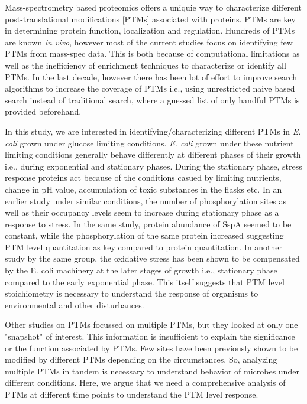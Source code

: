 \documentclass[12pt]{article}
\begin{document}
Mass-spectrometry based proteomics offers a uniquie way to characterize different post-translational modifications [PTMs] associated with proteins. PTMs are key in determining protein function, localization and regulation. Hundreds of PTMs are known \emph{in vivo}, however most of the current studies focus on identifying few PTMs from mass-spec data. This is both because of computational limitations as well as the inefficiency of enrichment techniques to characterize or identify all PTMs. In the last decade, however there has been lot of effort to improve search algorithms to increase the coverage of PTMs i.e., using unrestricted naive based search instead of traditional search, where a guessed list of only handful PTMs is provided beforehand.

In this study, we are interested in identifying/characterizing different PTMs in \emph{E. coli} grown under glucose limiting conditions. \emph{E. coli} grown under these nutrient limiting conditions generally behave differently at different phases of their growth i.e., during exponential and stationary phases. During the stationary phase, stress response proteins act because of the conditions casued by limiting nutrients, change in pH value, accumulation of toxic substances in the flasks etc. In an earlier study under similar conditions, the number of phosphorylation sites as well as their occupancy levels seem to increase during stationary phase as a response to stress. In the same study, protein abundance of SspA seemed to be constant, while the phosphorylation of the same protein increased suggesting PTM level quantitation as key compared to protein quantitation. In another study by the same group, the oxidative stress has been shown to be compensated by the E. coli machinery at the later stages of growth i.e., stationary phase compared to the early exponential phase. This itself suggests that PTM level stoichiometry is necessary to understand the response of organisms to environmental and other disturbances.

Other studies on PTMs focussed on multiple PTMs, but they looked at only one "snapshot" of interest. This information is insufficient to explain the significance or the function associated by PTMs. Few sites have been previously shown to be modified by different PTMs depending on the circumstances. So, analyzing multiple PTMs in tandem is necessary to understand behavior of microbes under different conditions. Here, we argue that we need a comprehensive analysis of PTMs at different time points to understand the PTM level response. 
\end{document}
